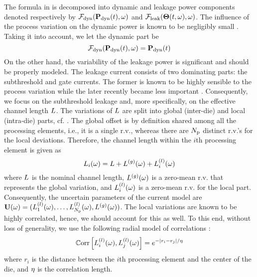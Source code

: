 The formula in  is decomposed into dynamic and leakage power components denoted respectively by $\mathcal{F}_{\text{dyn}}(\mathbf{P}_{\text{dyn}}(t), \omega)$ and $\mathcal{F}_{\text{leak}}({\boldsymbol\Theta}(t, \omega), \omega)$. The influence of the process variation on the dynamic power is known to be negligibly small \cite{juan2011, juan2012, srivastava2010}. Taking it into account, we let the dynamic part be
\[
  \mathcal{F}_{\text{dyn}}(\mathbf{P}_{\text{dyn}}(t), \omega) = \mathbf{P}_{\text{dyn}}(t)
\]
On the other hand, the variability of the leakage power is significant and should be properly modeled. The leakage current consists of two dominating parts: the subthreshold and gate currents. The former is known to be highly sensible to the process variation while the later recently became less important \cite{juan2011, juan2012}. Consequently, we focus on the subthreshold leakage and, more specifically, on the effective channel length $L$. The variations of $L$ are split into global (inter-die) and local (intra-die) parts, cf. \cite{juan2011, juan2012, shen2009, srivastava2010}. The global offset is by definition shared among all the processing elements, i.e., it is a single r.v., whereas there are ${N_\text{p}}$ distinct r.v.'s for the local deviations. Therefore, the channel length within the $i$th processing element is given as
\[
  L_i(\omega) = L + {L^{(g)}}(\omega) + L^{(l)}_i(\omega)
\]
where $L$ is the nominal channel length, ${L^{(g)}}(\omega)$ is a zero-mean r.v. that represents the global variation, and $L^{(l)}_i(\omega)$ is a zero-mean r.v. for the local part. Consequently, the uncertain parameters of the current model are $\mathbf{U}(\omega) = (L^{(l)}_1(\omega), \dotsc, L^{(l)}_{N_\text{p}}(\omega), {L^{(g)}}(\omega) )$. The local variations are known to be highly correlated, hence, we should account for this as well. To this end, without loss of generality, we use the following radial model of correlations \cite{ghanem1991}:
\begin{equation} \elabel{correlation-matrix}
  \oCorr{\lLeff_i(\o), \lLeff_j(\o)} = e^{-|r_i - r_j|/\corrLength}
\end{equation}
where $r_i$ is the distance between the $i$th processing element and the center of the die, and $\eta$ is the correlation length.

